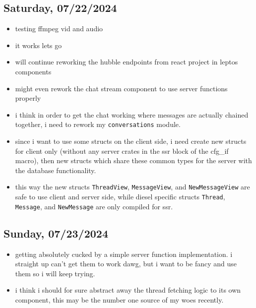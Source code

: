 \subsection*{Saturday, 07/22/2024}
\begin{itemize}
    \item testing ffmpeg vid and audio
    \item it works lets go
    \item will continue reworking the hubble endpoints from react project in
        leptos components
    \item might even rework the chat stream component to use server functions
        properly
    \item i think in order to get the chat working where messages are actually
        chained together, i need to rework my \texttt{conversations} module.
    \item since i want to use some structs on the client side, i need create new
        structs for client only (without any server crates in the ssr block of
        the cfg_if macro), then new structs which share these common types for
        the server with the database functionality.
    \item this way the new structs \texttt{ThreadView}, \texttt{MessageView},
        and \texttt{NewMessageView} are safe to use client and server side,
        while diesel specific structs \texttt{Thread}, \texttt{Message}, and
        \texttt{NewMessage} are only compiled for ssr.
\end{itemize}

\clearpage
\subsection*{Sunday, 07/23/2024}
\begin{itemize}
    \item getting absolutely cucked by a simple server function implementation.
        i straight up can't get them to work dawg, but i want to be fancy and
        use them so i will keep trying.
    \item i think i should for sure abstract away the thread fetching logic to
        its own component, this may be the number one source of my woes
        recently.
\end{itemize}
